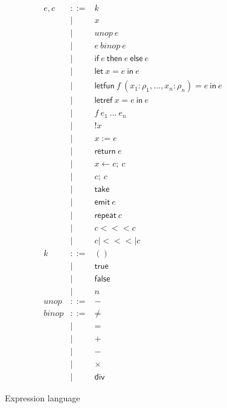 \documentclass[twocolumn]{article}
\newcommand{\bnfdef}{::=}
\newcommand{\bnfalt}{\mathrel{\mid}}
\newcommand{\kw}[1]{\textsf{#1}}
\newcommand{\arr}{\mathrel{<\!\!<\!\!<}}
\newcommand{\parr}{\mathrel{|\!\!<\!\!<\!\!<\!\!|}}
\begin{document}
\begin{figure}
\begin{equation*}
\begin{array}{lcl}
  e, c
     & \bnfdef & k \\
     & \bnfalt & x \\
     & \bnfalt & unop~ e \\
     & \bnfalt & e~ binop~ e \\
     & \bnfalt & \kw{if}~ e~ \kw{then}~ e~ \kw{else}~ e \\
     & \bnfalt & \kw{let}~ x \mathrel{=} e~ \kw{in}~ e \\
     & \bnfalt & \kw{letfun}~ f~ (x_1 : \rho_1, \ldots, x_n : \rho_n) \mathrel{=} e~ \kw{in}~ e \\
     & \bnfalt & \kw{letref}~ x \mathrel{=} e~ \kw{in}~ e \\
     & \bnfalt & f~ e_1~ \ldots~ e_n \\
     & \bnfalt & \kw{!} x \\
     & \bnfalt & x \mathrel{:=} e \\
     & \bnfalt & \kw{return}~ e \\
     & \bnfalt & x \mathrel{\leftarrow} c;~ c \\
     & \bnfalt & c;~ c \\
     & \bnfalt & \kw{take} \\
     & \bnfalt & \kw{emit}~ e \\
     & \bnfalt & \kw{repeat}~ c \\
     & \bnfalt & c \arr c \\
     & \bnfalt & c \parr c \\
  k
     & \bnfdef & () \\
     & \bnfalt & \kw{true} \\
     & \bnfalt & \kw{false} \\
     & \bnfalt & n \\
  unop
     & \bnfdef & - \\
  binop
     & \bnfdef & \ne \\
     & \bnfalt & = \\
     & \bnfalt & + \\
     & \bnfalt & - \\
     & \bnfalt & \times \\
     & \bnfalt & \kw{div}
\end{array}
\end{equation*}
\caption{Expression language}
\label{fig:lang:exp}
\end{figure}
\end{document}
